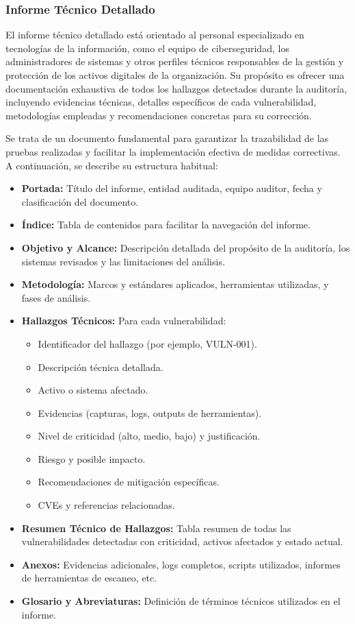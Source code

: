 \documentclass[a4paper, 11pt]{article}
\begin{document}
\subsubsection{Informe Técnico Detallado}

El informe técnico detallado está orientado al personal especializado en tecnologías de la información, como el equipo de ciberseguridad, los administradores de sistemas y otros perfiles técnicos responsables de la gestión y protección de los activos digitales de la organización. Su propósito es ofrecer una documentación exhaustiva de todos los hallazgos detectados durante la auditoría, incluyendo evidencias técnicas, detalles específicos de cada vulnerabilidad, metodologías empleadas y recomendaciones concretas para su corrección. 


Se trata de un documento fundamental para garantizar la trazabilidad de las pruebas realizadas y facilitar la implementación efectiva de medidas correctivas. A continuación, se describe su estructura habitual:

\begin{itemize}
  \item \textbf{Portada:} Título del informe, entidad auditada, equipo auditor, fecha y clasificación del documento.
  \item \textbf{Índice:} Tabla de contenidos para facilitar la navegación del informe.
  \item \textbf{Objetivo y Alcance:} Descripción detallada del propósito de la auditoría, los sistemas revisados y las limitaciones del análisis.
  \item \textbf{Metodología:} Marcos y estándares aplicados, herramientas utilizadas, y fases de análisis.
  \item \textbf{Hallazgos Técnicos:} Para cada vulnerabilidad:
  \begin{itemize}
    \item Identificador del hallazgo (por ejemplo, VULN-001).
    \item Descripción técnica detallada.
    \item Activo o sistema afectado.
    \item Evidencias (capturas, logs, outputs de herramientas).
    \item Nivel de criticidad (alto, medio, bajo) y justificación.
    \item Riesgo y posible impacto.
    \item Recomendaciones de mitigación específicas.
    \item CVEs y referencias relacionadas.
  \end{itemize}
  \item \textbf{Resumen Técnico de Hallazgos:} Tabla resumen de todas las vulnerabilidades detectadas con criticidad, activos afectados y estado actual.
  \item \textbf{Anexos:} Evidencias adicionales, logs completos, scripts utilizados, informes de herramientas de escaneo, etc.
  \item \textbf{Glosario y Abreviaturas:} Definición de términos técnicos utilizados en el informe.
\end{itemize}
\end{document}
